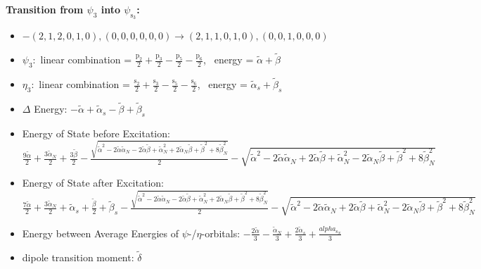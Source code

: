 \documentclass[12pt,a4paper]{article}
\begin{document}
        \noindent\textbf{Transition from $\psi_{3}$ into $\psi_{\text{s}_{3}}$:}
        \begin{itemize}
            \item $- (2, 1, 2, 0, 1, 0), (0, 0, 0, 0, 0, 0) \rightarrow (2, 1, 1, 0, 1, 0), (0, 0, 1, 0, 0, 0)$
        
            \item $\psi_{3}:$ linear combination = $\frac{\text{p}_{2}}{2} + \frac{\text{p}_{3}}{2} - \frac{\text{p}_{5}}{2} - \frac{\text{p}_{6}}{2}$, \
            energy = $\tilde{\alpha} + \tilde{\beta}$
            
            \item $\eta_{3}:$ linear combination = $\frac{\text{s}_{2}}{2} + \frac{\text{s}_{3}}{2} - \frac{\text{s}_{5}}{2} - \frac{\text{s}_{6}}{2}$, \
            energy = $\tilde{\alpha}_{s} + \tilde{\beta}_{s}$
            
                \item $\Delta$ Energy: $- \tilde{\alpha} + \tilde{\alpha}_{s} - \tilde{\beta} + \tilde{\beta}_{s}$
                \item Energy of State before Excitation: $\frac{9 \tilde{\alpha}}{2} + \frac{3 \tilde{\alpha}_{N}}{2} + \frac{3 \tilde{\beta}}{2} - \frac{\sqrt{\tilde{\alpha}^{2} - 2 \tilde{\alpha} \tilde{\alpha}_{N} - 2 \tilde{\alpha} \tilde{\beta} + \tilde{\alpha}_{N}^{2} + 2 \tilde{\alpha}_{N} \tilde{\beta} + \tilde{\beta}^{2} + 8 \tilde{\beta}_{N}^{2}}}{2} - \sqrt{\tilde{\alpha}^{2} - 2 \tilde{\alpha} \tilde{\alpha}_{N} + 2 \tilde{\alpha} \tilde{\beta} + \tilde{\alpha}_{N}^{2} - 2 \tilde{\alpha}_{N} \tilde{\beta} + \tilde{\beta}^{2} + 8 \tilde{\beta}_{N}^{2}}$
                \item Energy of State after Excitation: $\frac{7 \tilde{\alpha}}{2} + \frac{3 \tilde{\alpha}_{N}}{2} + \tilde{\alpha}_{s} + \frac{\tilde{\beta}}{2} + \tilde{\beta}_{s} - \frac{\sqrt{\tilde{\alpha}^{2} - 2 \tilde{\alpha} \tilde{\alpha}_{N} - 2 \tilde{\alpha} \tilde{\beta} + \tilde{\alpha}_{N}^{2} + 2 \tilde{\alpha}_{N} \tilde{\beta} + \tilde{\beta}^{2} + 8 \tilde{\beta}_{N}^{2}}}{2} - \sqrt{\tilde{\alpha}^{2} - 2 \tilde{\alpha} \tilde{\alpha}_{N} + 2 \tilde{\alpha} \tilde{\beta} + \tilde{\alpha}_{N}^{2} - 2 \tilde{\alpha}_{N} \tilde{\beta} + \tilde{\beta}^{2} + 8 \tilde{\beta}_{N}^{2}}$
                \item Energy between Average Energies of $\psi$-/$\eta$-orbitals: $- \frac{2 \tilde{\alpha}}{3} - \frac{\tilde{\alpha}_{N}}{3} + \frac{2 \tilde{\alpha}_{s}}{3} + \frac{alpha_{\text{s}_N}}{3}$
            
            \item dipole transition moment: $\tilde{\delta}$
        
        \end{itemize}
        
\end{document}
